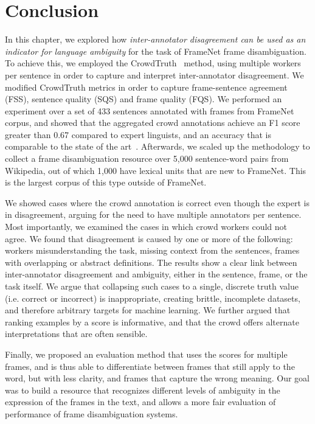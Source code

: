 \section{Conclusion}

In this chapter, we explored how \emph{inter-annotator disagreement can be used as an indicator for language ambiguity} for the task of FrameNet frame disambiguation. To achieve this, we employed the CrowdTruth~\cite{aroyo2014threesides} method, using multiple workers per sentence in order to capture and interpret inter-annotator disagreement. We modified CrowdTruth metrics in order to capture frame-sentence agreement (FSS), sentence quality (SQS) and frame quality (FQS). We performed an experiment over a set of 433 sentences annotated with frames from FrameNet corpus, and showed that the aggregated crowd annotations achieve an F1 score greater than 0.67 compared to expert linguists, and an accuracy that is comparable to the state of the art~\cite{Hong:2011:GCR:2018966.2018970}. Afterwards, we scaled up the methodology to collect a frame disambiguation resource over 5,000 sentence-word pairs from Wikipedia, out of which 1,000 have lexical units that are new to FrameNet. This is the largest corpus of this type outside of FrameNet.

We showed cases where the crowd annotation is correct even though the expert is in disagreement, arguing for the need to have multiple annotators per sentence. Most importantly, we examined the cases in which crowd workers could not agree. We found that disagreement is caused by one or more of the following: workers misunderstanding the task, missing context from the sentences, frames with overlapping or abstract definitions. The results show a clear link between inter-annotator disagreement and ambiguity, either in the sentence, frame, or the task itself. We argue that collapsing such cases to a single, discrete truth value (i.e. correct or incorrect) is inappropriate, creating brittle, incomplete datasets, and therefore arbitrary targets for machine learning.  We further argued that ranking examples by a score is informative, and that the crowd offers alternate interpretations that are often sensible.

Finally, we proposed an evaluation method that uses the scores for multiple frames, and is thus able to differentiate between frames that still apply to the word, but with less clarity, and frames that capture the wrong meaning. Our goal was to build a resource that recognizes different levels of ambiguity in the expression of the frames in the text, and allows a more fair evaluation of performance of frame disambiguation systems.

